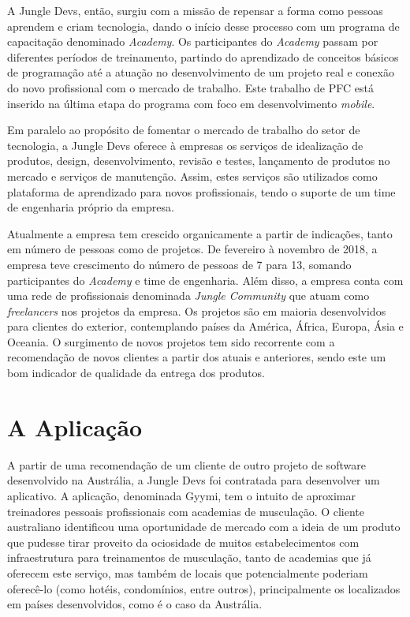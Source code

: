 A Jungle Devs, então, surgiu com a missão de repensar a forma como pessoas aprendem e criam tecnologia, dando o início desse processo com um programa de capacitação denominado \textit{Academy}. Os participantes do \textit{Academy} passam por diferentes períodos de treinamento, partindo do aprendizado de conceitos básicos de programação até a atuação no desenvolvimento de um projeto real e conexão do novo profissional com o mercado de trabalho. Este trabalho de PFC está inserido na última etapa do programa com foco em desenvolvimento \textit{mobile}.

Em paralelo ao propósito de fomentar o mercado de trabalho do setor de tecnologia, a Jungle Devs oferece à empresas os serviços de idealização de produtos, design, desenvolvimento, revisão e testes, lançamento de produtos no mercado e serviços de manutenção. Assim, estes serviços são utilizados como plataforma de aprendizado para novos profissionais, tendo o suporte de um time de engenharia próprio da empresa.

Atualmente a empresa tem crescido organicamente a partir de indicações, tanto em número de pessoas como de projetos. De fevereiro à novembro de 2018, a empresa teve crescimento do número de pessoas de 7 para 13, somando participantes do \textit{Academy} e time de engenharia. Além disso, a empresa conta com uma rede de profissionais denominada \textit{Jungle Community} que atuam como \textit{freelancers} nos projetos da empresa. Os projetos são em maioria desenvolvidos para clientes do exterior, contemplando países da América, África, Europa, Ásia e Oceania. O surgimento de novos projetos tem sido recorrente com a recomendação de novos clientes a partir dos atuais e anteriores, sendo este um bom indicador de qualidade da entrega dos produtos.

\section{A Aplicação}
A partir de uma recomendação de um cliente de outro projeto de software desenvolvido na Austrália, a Jungle Devs foi contratada para desenvolver um aplicativo. A aplicação, denominada Gyymi, tem o intuito de aproximar treinadores pessoais profissionais com academias de musculação. O cliente australiano identificou uma oportunidade de mercado com a ideia de um produto que pudesse tirar proveito da ociosidade de muitos estabelecimentos com infraestrutura para treinamentos de musculação, tanto de academias que já oferecem este serviço, mas também de locais que potencialmente poderiam oferecê-lo (como hotéis, condomínios, entre outros), principalmente os localizados em países desenvolvidos, como é o caso da Austrália.

